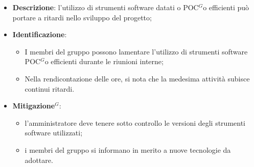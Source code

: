 \label{risk:strumenti software inadeguati}
\begin{itemize}
	\item \textbf{Descrizione}: l'utilizzo di strumenti software datati o \gls{POC}$^G$o
	      efficienti può portare a ritardi nello sviluppo del progetto;

	\item \textbf{Identificazione}:
	      \begin{itemize}
		      \item I membri del gruppo possono lamentare l'utilizzo di strumenti
		            software \gls{POC}$^G$o efficienti durante le riunioni interne;
		      \item Nella rendicontazione delle ore, si nota che la medesima
		            attività subisce continui ritardi.
	      \end{itemize}

	\item \textbf{\gls{Mitigazione}$^G$}:
	      \begin{itemize}
		      \item l'amministratore deve tenere sotto controllo le versioni
		            degli strumenti software utilizzati;

		      \item i membri del gruppo si informano in merito a nuove
		            tecnologie da adottare.
	      \end{itemize}
\end{itemize}
